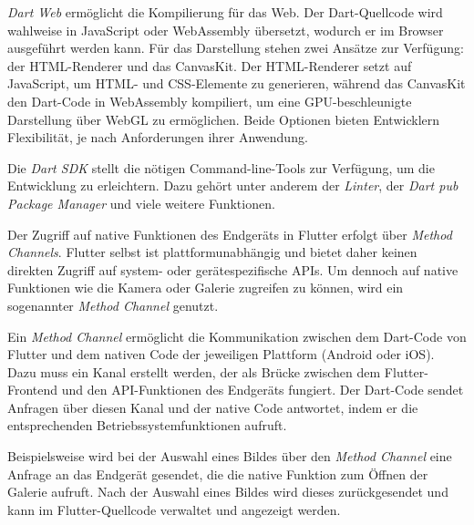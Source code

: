 \vspace{0.5cm}

\textit{Dart Web} ermöglicht die Kompilierung für das Web. Der Dart-Quellcode wird wahlweise in JavaScript oder WebAssembly übersetzt, wodurch er im Browser ausgeführt werden kann. Für das Darstellung stehen zwei Ansätze zur Verfügung: der HTML-Renderer und das CanvasKit. Der HTML-Renderer setzt auf JavaScript, um HTML- und CSS-Elemente zu generieren, während das CanvasKit den Dart-Code in WebAssembly kompiliert, um eine GPU-beschleunigte Darstellung über WebGL zu ermöglichen. Beide Optionen bieten Entwicklern Flexibilität, je nach Anforderungen ihrer Anwendung.

\vspace{0.5cm}

Die \textit{Dart SDK} stellt die nötigen Command-line-Tools zur Verfügung, um die Entwicklung zu erleichtern. Dazu gehört unter anderem der \textit{Linter}, der \textit{Dart pub Package Manager} und viele weitere Funktionen.

\vspace{0.5cm}

Der Zugriff auf native Funktionen des Endgeräts in Flutter erfolgt über \textit{Method Channels}. Flutter selbst ist plattformunabhängig und bietet daher keinen direkten Zugriff auf system- oder gerätespezifische APIs. Um dennoch auf native Funktionen wie die Kamera oder Galerie zugreifen zu können, wird ein sogenannter \textit{Method Channel} genutzt.

\vspace{0.5cm}

Ein \textit{Method Channel} ermöglicht die Kommunikation zwischen dem Dart-Code von Flutter und dem nativen Code der jeweiligen Plattform (Android oder iOS). Dazu muss ein Kanal erstellt werden, der als Brücke zwischen dem Flutter-Frontend und den API-Funktionen des Endgeräts fungiert. Der Dart-Code sendet Anfragen über diesen Kanal und der native Code antwortet, indem er die entsprechenden Betriebssystemfunktionen aufruft.

\vspace{0.5cm}

Beispielsweise wird bei der Auswahl eines Bildes über den \textit{Method Channel} eine Anfrage an das Endgerät gesendet, die die native Funktion zum Öffnen der Galerie aufruft. Nach der Auswahl eines Bildes wird dieses zurückgesendet und kann im Flutter-Quellcode verwaltet und angezeigt werden.